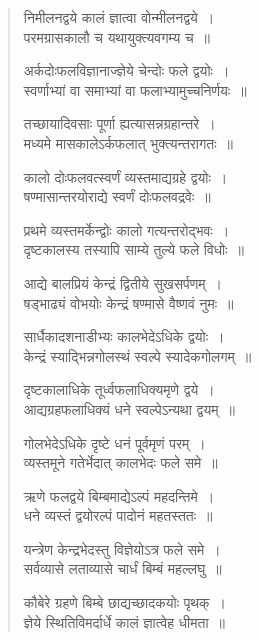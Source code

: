 \documentclass[11pt, openany]{book}
\begin{document}
\newpage
\begin{quote}
{\qt 	
निमीलनद्वये कालं ज्ञात्वा वोन्मीलनद्वये~।\\
परमग्रासकालौ च यथायुक्त्यवगम्य च~॥

अर्कदोःफलविज्ञानाज्ज्ञेये चेन्दोः फले द्वयोः~।\\
स्वर्णाभ्यां वा समाभ्यां वा फलाभ्यामुच्चनिर्णयः~॥

तच्छायादिवसाः पूर्णा ह्यत्यासन्नग्रहान्तरे~।\\
मध्यमे मासकालेऽर्कफलात् भुक्त्यन्तरागतः~॥

कालो दोःफलवत्स्वर्णं व्यस्तमाद्यग्रहे द्वयोः~।\\
षण्मासान्तरयोराद्ये स्वर्णं दोःफलवद्रवेः~॥

प्रथमे व्यस्तमर्केन्द्वोः कालो गत्यन्तरोद्भवः~।\\
दृष्टकालस्य तस्यापि साम्ये तुल्ये फले विधोः~॥

आद्ये बालप्रियं केन्द्रं द्वितीये सुखसर्पणम्~।\\
षड्भाढ्यं वोभयोः केन्द्रं षण्मासे वैष्णवं नुमः~॥

सार्धैकादशनाडीभ्यः कालभेदेऽधिके द्वयोः~।\\
केन्द्रं स्याद्भिन्नगोलस्थं स्वल्पे स्यादेकगोलगम्~॥

दृष्टकालाधिके तूर्ध्वफलाधिक्यमृणे द्वये~।\\
आद्यग्रहफलाधिक्यं धने स्वल्पेऽन्यथा द्वयम्~॥

गोलभेदेऽधिके दृष्टे धनं पूर्वमृणं परम्~।\\
व्यस्तमूने गतेर्भेदात् कालभेदः फले समे~॥

ऋणे फलद्वये बिम्बमाद्येऽल्पं महदन्तिमे~।\\
धने व्यस्तं द्वयोरल्पं पादोनं महतस्ततः~॥

यन्त्रेण केन्द्रभेदस्तु विज्ञेयोऽत्र फले समे~।\\
सर्वव्यासे लताव्यासे चार्धं बिम्बं महल्लघु~॥

कौबेरे ग्रहणे बिम्बे छाद्यच्छादकयोः पृथक्~।\\
ज्ञेये स्थितिविमर्दार्धे कालं ज्ञात्वेह धीमता~॥}

\end{quote}
\newpage
\end{document}
